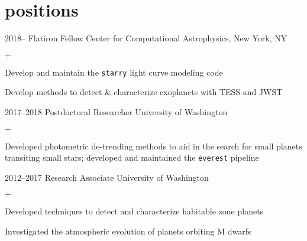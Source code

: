 \documentclass[]{luger-cv} %
\begin{document}

\section{positions}

\begin{entrylist}


    \entry
    {2018--}
    {Flatiron Fellow}
    {Center for Computational Astrophysics, New York, NY}
    {%
        \vspace{-1em}
        \begin{list}{$+$}{\cvlist}
            \item Develop and maintain the \texttt{starry} light curve modeling code
            \item Develop methods to detect \& characterize exoplanets with TESS and JWST
        \end{list}
    }


    \entry
    {2017--2018}
    {Postdoctoral Researcher}
    {University of Washington}
    {%
        \vspace{-1em}
        \begin{list}{$+$}{\cvlist}
            \item Developed photometric de-trending methods to aid in the search for small
                  planets transiting small stars; developed and maintained the \texttt{everest} pipeline
        \end{list}
    }


    \entry
    {2012--2017}
    {Research Associate}
    {University of Washington}
    {%
        \vspace{-1em}
        \begin{list}{$+$}{\cvlist}
            \item Developed techniques to detect and characterize habitable
                  zone planets
            \item Investigated the atmospheric evolution of planets orbiting M dwarfs
        \end{list}
    }


\end{entrylist}
\end{document}
